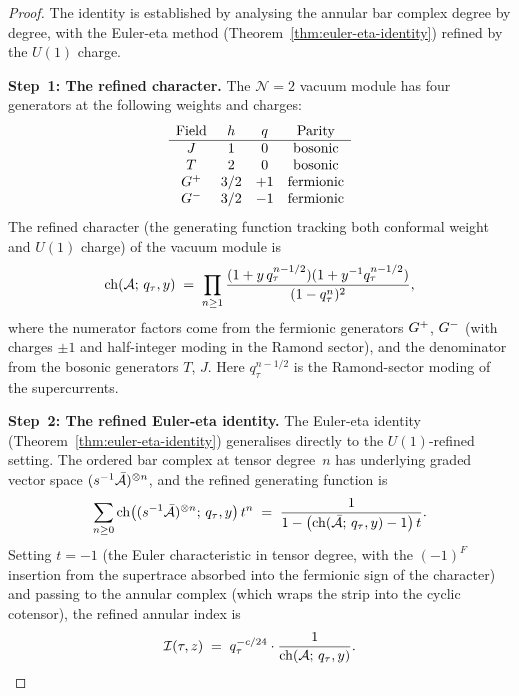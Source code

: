 \begin{proof}
The identity is established by analysing the annular bar
complex degree by degree, with the Euler-eta method
(Theorem~\ref{thm:euler-eta-identity}) refined by the
$U(1)$ charge.

\medskip\noindent
\textbf{Step~1: The refined character.}
The $\mathcal N=2$ vacuum module has four generators
at the following weights and charges:
\[
\begin{array}{cccc}
\text{Field} & h & q & \text{Parity} \\
\hline
J & 1 & 0 & \text{bosonic} \\
T & 2 & 0 & \text{bosonic} \\
G^+ & 3/2 & +1 & \text{fermionic} \\
G^- & 3/2 & -1 & \text{fermionic}
\end{array}
\]
The refined character (the generating function tracking
both conformal weight and $U(1)$ charge) of the vacuum
module is
\begin{equation}\label{eq:n2-refined-character}
\operatorname{ch}(\mathcal{A};\,q_\tau,y)
\;=\;
\prod_{n\ge 1}
\frac{(1+y\,q_\tau^{n-1/2})(1+y^{-1}q_\tau^{n-1/2})}
{(1-q_\tau^n)^2},
\end{equation}
where the numerator factors come from the fermionic
generators $G^+$, $G^-$ (with charges $\pm 1$ and
half-integer moding in the Ramond sector), and the
denominator from the bosonic generators $T$, $J$.
Here $q_\tau^{n-1/2}$ is the Ramond-sector moding of
the supercurrents.

\medskip\noindent
\textbf{Step~2: The refined Euler-eta identity.}
The Euler-eta identity
(Theorem~\ref{thm:euler-eta-identity}) generalises
directly to the $U(1)$-refined setting.
The ordered bar complex at tensor degree~$n$ has
underlying graded vector space
$(s^{-1}\bar{\mathcal{A}})^{\otimes n}$, and the refined
generating function is
\[
\sum_{n\ge 0}
\operatorname{ch}\bigl(
(s^{-1}\bar{\mathcal{A}})^{\otimes n};\,q_\tau,y
\bigr)\,t^n
\;=\;
\frac{1}
{1-\bigl(\operatorname{ch}(\bar{\mathcal{A}};\,q_\tau,y)-1\bigr)\,t}.
\]
Setting $t=-1$ (the Euler characteristic in tensor
degree, with the $(-1)^F$ insertion from the supertrace
absorbed into the fermionic sign of the character) and
passing to the annular complex (which wraps the strip
into the cyclic cotensor), the refined annular index is
\begin{equation}\label{eq:refined-euler-eta}
\mathcal{I}(\tau,z)
\;=\;
q_\tau^{-c/24}\cdot
\frac{1}{\operatorname{ch}(\mathcal{A};\,q_\tau,y)}.
\end{equation}


\end{proof}
